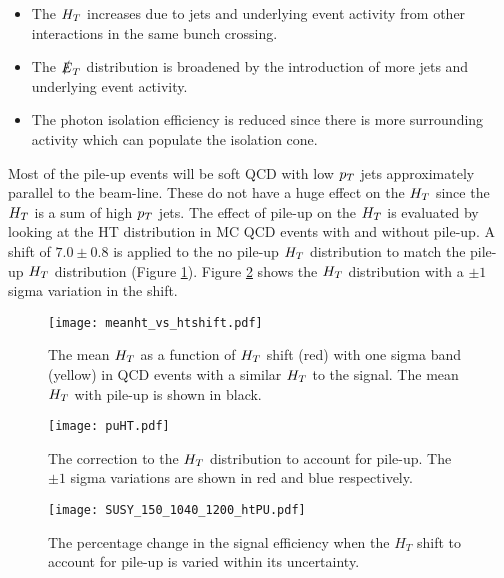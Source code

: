 \begin{itemize}
\item The $H_{T}$ increases due to jets and underlying event activity from other 
interactions in the same bunch crossing.
\item The $\slashed{E}_{T}$ distribution is broadened by the introduction of more jets and
underlying event activity.
\item The photon isolation efficiency is reduced since there is more 
surrounding activity which can populate the isolation cone.
\end{itemize}

Most of the pile-up events will be soft QCD with low $p_{T}$ jets approximately 
parallel to the beam-line. These do not have a huge effect on the $H_{T}$ since 
the $H_{T}$ is a sum of high $p_{T}$ jets. The effect of pile-up on the $H_{T}$ is 
evaluated by looking at the HT distribution in MC QCD events with and without 
pile-up. A shift of $7.0\pm0.8$ is applied to the no pile-up $H_{T}$ distribution 
to match the pile-up $H_{T}$ distribution (Figure \ref{fig:meanht_vs_htshift}). 
Figure \ref{fig:puHT} shows the $H_{T}$ distribution with a $\pm 1$ sigma 
variation in the shift. \\

\begin{figure}
\begin{center}
\texttt{[image: meanht\_vs\_htshift.pdf]}
\end{center}
\caption{The mean $H_{T}$ as a function of $H_{T}$ shift (red) with one sigma band 
(yellow) in QCD events with a similar $H_{T}$ to the signal. The mean $H_{T}$ with 
pile-up is shown in black.}
\label{fig:meanht_vs_htshift}
\end{figure}

\begin{figure}
\begin{center}
\texttt{[image: puHT.pdf]}
\end{center}
\caption{The correction to the $H_{T}$ distribution to account for pile-up. The
$\pm 1$ sigma variations are shown in red and blue respectively.}
\label{fig:puHT}
\end{figure}

\begin{figure}
\begin{center}
\texttt{[image: SUSY\_150\_1040\_1200\_htPU.pdf]}
\end{center}
\caption{The percentage change in the signal efficiency when the $H_{T}$ shift
to account for pile-up is varied within its uncertainty.} 
\label{fig:puHT_Numbers}
\end{figure}

